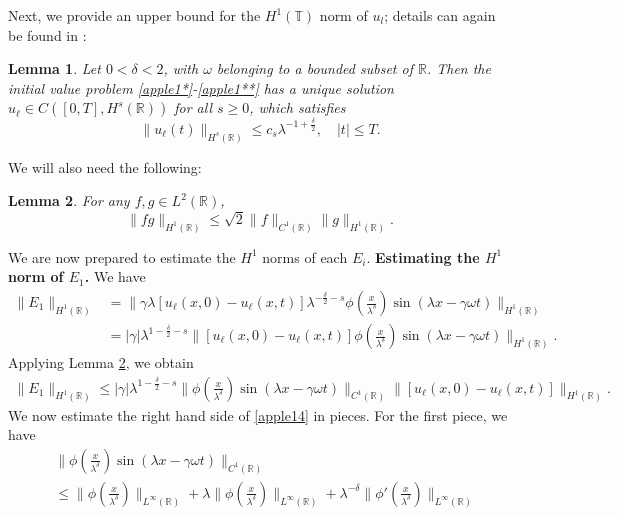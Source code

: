 \documentclass[12pt,reqno]{amsart}
\newcommand{\rr}{\mathbb{R}}
\newcommand{\ci}{\mathbb{T}}
\theoremstyle{plain}  %
\newtheorem{lemma}{Lemma}
\theoremstyle{definition}
\begin{document}
				 Next, we provide an upper bound for the $H^1(\ci)$ norm of
				 $u_l$; details can again be found in \cite{hk}:
				\begin{lemma}
					\label{appleb}
					Let $0<\delta<2$, with $\omega$ belonging to a bounded
					subset of $\rr$. Then the initial value problem
					\eqref{apple1*}-\eqref{apple1**} has a unique solution
					$u_\ell \in C\left( [0,T], H^s(\rr) \right)$ for all $s
					\ge 0$, which 
					satisfies
					\begin{equation}
						\label{apple10'}
						\|u_\ell(t)\|_{H^s(\rr)} \le c_s \lambda^{-1 +
						\frac{\delta}{2}}, \quad |t| \le T.
					\end{equation}
				\end{lemma}
								We will also need the following:
\begin{lemma}
	\label{applec}
	For any $f,g \in L^2(\rr)$,
	\begin{equation*}
		\|fg\|_{H^1(\rr)} \le \sqrt{2} \|f\|_{C^1(\rr)} \|g\|_{H^1(\rr)}.
	\end{equation*}
\end{lemma}
%
We are now prepared to estimate the $H^1$ norms of each $E_i$.
\vskip0.1in
{\bf Estimating the $H^1$ norm of $\hyperref[all_errors_together]{E_1}$.} We have
\begin{equation*}
	\begin{split}
		\|E_1\|_{H^1(\rr)}
		& = \| \gamma \lambda \left[ u_\ell(x,0) - u_\ell(x,t) \right]
		\lambda^{-\frac{\delta}{2}-s} \phi\left( \frac{x}{\lambda^\delta}
		\right ) \sin (\lambda x - \gamma \omega t )\|_{H^1(\rr)}
		\\
		& = |\gamma| \lambda^{1 -\frac{\delta}{2} -s } \|\left[ u_\ell(x,0) - u_\ell(x,t)
		\right] \phi\left( \frac{x}{\lambda^\delta} \right )
		\sin\left( \lambda x - \gamma \omega t
		\right) \|_{H^1(\rr)}.
	\end{split}
\end{equation*}
Applying Lemma \ref{applec}, we obtain
\begin{equation}
	\begin{split}
		\|E_1\|_{H^1(\rr)} \le |\gamma| \lambda^{1 - \frac{\delta}{2} -s } \|\phi
		\left( \frac{x}{\lambda^\delta} \right) \sin (\lambda x - \gamma \omega t)
		\|_{C^1(\rr)} \|[u_\ell (x,0) - u_\ell (x,t) ] \|_{H^1(\rr)}.
		\label{apple14}
	\end{split}
\end{equation}
We now estimate the right hand side of \eqref{apple14} in pieces. For the first piece, we
have
\begin{equation*}
	\begin{split}
		& \|\phi \left( \frac{x}{\lambda^\delta} \right) \sin (\lambda x - \gamma \omega t)
		\|_{C^1(\rr)} 
		\\
		&
		\le \|\phi \left( \frac{x}{\lambda^\delta} \right) \|_{L^\infty(\rr)} + \lambda
		\|\phi\left( \frac{x}{\lambda^\delta} \right)\|_{L^\infty(\rr)} +
		\lambda^{-\delta} \|\phi'\left( \frac{x}{\lambda^\delta}
		\right)\|_{L^\infty(\rr)}
	\end{split}
\end{equation*}
\end{document}
